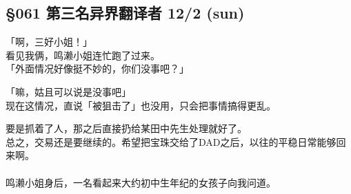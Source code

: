 \subsection{§061 第三名异界翻译者 12/2 (sun)}

「啊，三好小姐！」\\

看见我俩，鸣濑小姐连忙跑了过来。\\

「外面情况好像挺不妙的，你们没事吧？」

「嘛，姑且可以说是没事吧」\\

现在这情况，直说「被狙击了」也没用，只会把事情搞得更乱。

要是抓着了人，那之后直接扔给某田中先生处理就好了。\\

总之，交易还是要继续的。希望把宝珠交给了DAD之后，以往的平稳日常能够回来啊。\\

\\

鸣濑小姐身后，一名看起来大约初中生年纪的女孩子向我问道。\\

\\

